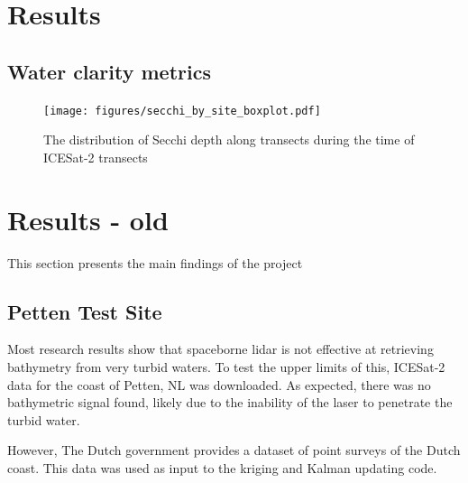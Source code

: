 
\chapter{Results}

\section{Water clarity metrics}
\begin{figure}[ht]
    \centering
    \texttt{[image: figures/secchi\_by\_site\_boxplot.pdf]}
    \caption{The distribution of Secchi depth along transects during the time of ICESat-2 transects}
    \label{fig:secchi-boxplot}
\end{figure}


\chapter{Results - old}
This section presents the main findings of the project



\section{Petten Test Site}
Most research results show that spaceborne lidar is not effective at retrieving bathymetry from very turbid waters. To test the upper limits of this, ICESat-2 data for the coast of Petten, NL was downloaded. As expected, there was no bathymetric signal found, likely due to the inability of the laser to penetrate the turbid water.

However, The Dutch government provides a dataset of point surveys of the Dutch coast. This data was used as input to the kriging and Kalman updating code.

